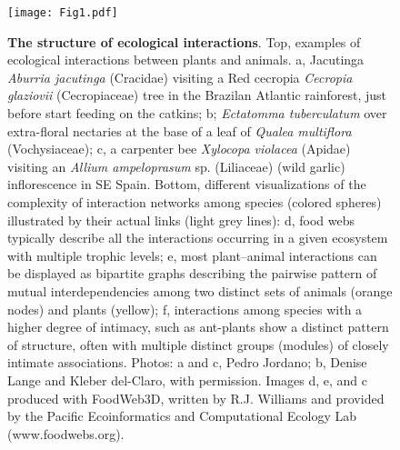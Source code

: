 \documentclass[10pt,letterpaper]{article}
\begin{document}
\begin{figure}[h]
\begin{adjustwidth}{-2.25in}{0in}
\caption{\textbf{The structure of ecological interactions}. Top, examples of ecological interactions between plants and animals. a, Jacutinga \textit{Aburria jacutinga} (Cracidae) visiting a Red cecropia \textit{Cecropia glaziovii} (Cecropiaceae) tree in the Brazilan Atlantic rainforest, just before start feeding on the catkins; b; \textit{Ectatomma tuberculatum} over extra-floral nectaries at the base of a leaf of \textit{Qualea multiflora} (Vochysiaceae); c, a carpenter bee \textit{Xylocopa violacea} (Apidae) visiting an \textit{Allium ampeloprasum} sp. (Liliaceae) (wild garlic) inflorescence in SE Spain. Bottom, different visualizations of the complexity of interaction networks among species (colored spheres) illustrated by their actual links (light grey lines): d, food webs typically describe all the interactions occurring in a given ecosystem with multiple trophic levels; e, most plant–animal interactions can be displayed as bipartite graphs describing the pairwise pattern of mutual interdependencies among two distinct sets of animals (orange nodes) and plants (yellow); f, interactions among species with a higher degree of intimacy, such as ant-plants show a distinct pattern of structure, often with multiple distinct groups (modules) of closely intimate associations. Photos: a and c, Pedro Jordano; b, Denise Lange and Kleber del-Claro, with permission. Images d, e, and c produced with FoodWeb3D, written by R.J. Williams and provided by the Pacific Ecoinformatics and Computational Ecology Lab (www.foodwebs.org).}
\label{fig1}
  \begin{center}
    \texttt{[image: Fig1.pdf]}
  \end{center}
\end{adjustwidth}
\end{figure}
\end{document}
